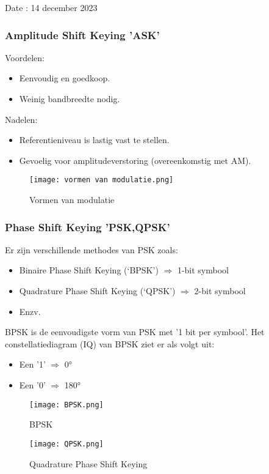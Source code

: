 Date : 14 december 2023

\subsubsection{Amplitude Shift Keying 'ASK'}

Voordelen:
\begin{itemize}
  \item Eenvoudig en goedkoop.
  \item Weinig bandbreedte nodig.
\end{itemize}

Nadelen:
\begin{itemize}
  \item Referentieniveau is lastig vast te stellen.
  \item Gevoelig voor amplitudeverstoring (overeenkomstig met AM).
\end{itemize}

\begin{figure}[H]
\centering
\texttt{[image: vormen van modulatie.png]}
\caption{Vormen van modulatie}
\end{figure}

\subsubsection{Phase Shift Keying 'PSK,QPSK'}

Er zijn verschillende methodes van PSK zoals:
\begin{itemize}
  \item Binaire Phase Shift Keying (`BPSK') $\Rightarrow$ 1-bit symbool
  \item Quadrature Phase Shift Keying (`QPSK') $\Rightarrow$ 2-bit symbool
  \item Enzv.
\end{itemize}

BPSK is de eenvoudigste vorm van PSK met '1 bit per symbool'. Het constellatiediagram (IQ) van BPSK ziet er als volgt uit:
\begin{itemize}
  \item Een '1' $\Rightarrow$ 0°
  \item Een '0' $\Rightarrow$ 180°
\end{itemize}

\begin{figure}[H]
\centering
\texttt{[image: BPSK.png]}
\caption{BPSK}
\end{figure}

\begin{figure}[H]
\centering
\texttt{[image: QPSK.png]}
\caption{Quadrature Phase Shift Keying}
\end{figure}

